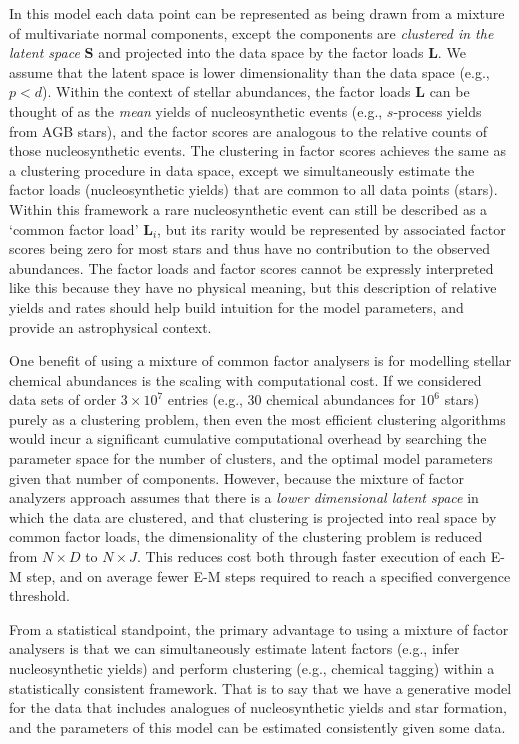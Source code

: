 \documentclass[twocolumn]{aastex61}
\newcommand{\factorloads}{\textbf{L}}
\newcommand{\factorscores}{\textbf{S}}
\begin{document}
In this model each data point can be represented as being drawn
from a mixture of multivariate normal components, except the components
are \emph{clustered in the latent space} $\factorscores$ and projected
into the data space by the factor loads $\factorloads$. 
We assume that the latent space is lower dimensionality than the
data space (e.g., $p < d$).
Within the context of stellar abundances, the factor loads
$\factorloads$ can be thought of as the \emph{mean} yields
of nucleosynthetic
events (e.g., $s$-process yields from AGB stars), and the
factor scores are analogous to the relative counts of those 
nucleosynthetic events. The clustering in factor scores
achieves the same as a clustering procedure in data space,
except we simultaneously estimate the factor loads
(nucleosynthetic yields) that are common to all data points 
(stars). Within this framework a rare nucleosynthetic event
can still be described as a `common factor load' $\factorloads_i$, 
but its rarity would be represented by associated factor
scores being zero for most stars and thus have no contribution
to the observed abundances. The factor loads and factor scores 
cannot be expressly interpreted like this because they have no
physical meaning, but this description of relative yields and 
rates should help build intuition for the model parameters,
and provide an astrophysical context.


One benefit of using a mixture of common factor analysers is
for modelling stellar chemical abundances is the scaling with
computational cost. If we considered data sets of order $3\times10^7$
entries (e.g., 30 chemical abundances for $10^6$ stars) purely as a
clustering problem, then even the most efficient clustering
algorithms would incur a significant cumulative computational 
overhead by searching the parameter space for the number of
clusters, and the optimal model parameters given that number
of components. However, because the mixture of factor analyzers
approach assumes that there is a \emph{lower dimensional latent 
space} in which the data are clustered, and that clustering is 
projected into real space by common factor loads, the 
dimensionality of the clustering problem is reduced from 
$N \times D$ to $N \times J$. This reduces cost both through
faster execution of each E-M step, and on average fewer E-M steps
required to reach a specified convergence threshold.

From a statistical standpoint, the primary advantage to using
a mixture of factor analysers is that we can simultaneously
estimate latent factors (e.g., infer nucleosynthetic 
yields) and perform clustering (e.g., chemical tagging) 
within a statistically consistent framework. That is to say
that we have a generative model for the data that includes
analogues of nucleosynthetic yields and star formation,
and the parameters of this model can be estimated consistently
given some data.
\end{document}
